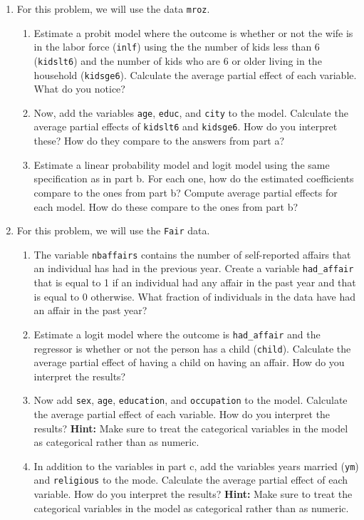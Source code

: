 \documentclass[
  letterpaper,
  DIV=11,
  numbers=noendperiod]{scrreprt}
\begin{document}
\begin{enumerate}
\def\labelenumi{\arabic{enumi}.}
\item
  For this problem, we will use the data \texttt{mroz}.

  \begin{enumerate}
  \def\labelenumii{\alph{enumii})}
  \item
    Estimate a probit model where the outcome is whether or not the wife
    is in the labor force (\texttt{inlf}) using the the number of kids
    less than 6 (\texttt{kidslt6}) and the number of kids who are 6 or
    older living in the household (\texttt{kidsge6}). Calculate the
    average partial effect of each variable. What do you notice?
  \item
    Now, add the variables \texttt{age}, \texttt{educ}, and
    \texttt{city} to the model. Calculate the average partial effects of
    \texttt{kidslt6} and \texttt{kidsge6}. How do you interpret these?
    How do they compare to the answers from part a?
  \item
    Estimate a linear probability model and logit model using the same
    specification as in part b. For each one, how do the estimated
    coefficients compare to the ones from part b? Compute average
    partial effects for each model. How do these compare to the ones
    from part b?
  \end{enumerate}
\item
  For this problem, we will use the \texttt{Fair} data.

  \begin{enumerate}
  \def\labelenumii{\alph{enumii})}
  \item
    The variable \texttt{nbaffairs} contains the number of self-reported
    affairs that an individual has had in the previous year. Create a
    variable \texttt{had\_affair} that is equal to 1 if an individual
    had any affair in the past year and that is equal to 0 otherwise.
    What fraction of individuals in the data have had an affair in the
    past year?
  \item
    Estimate a logit model where the outcome is \texttt{had\_affair} and
    the regressor is whether or not the person has a child
    (\texttt{child}). Calculate the average partial effect of having a
    child on having an affair. How do you interpret the results?
  \item
    Now add \texttt{sex}, \texttt{age}, \texttt{education}, and
    \texttt{occupation} to the model. Calculate the average partial
    effect of each variable. How do you interpret the results?
    \textbf{Hint:} Make sure to treat the categorical variables in the
    model as categorical rather than as numeric.
  \item
    In addition to the variables in part c, add the variables years
    married (\texttt{ym}) and \texttt{religious} to the mode. Calculate
    the average partial effect of each variable. How do you interpret
    the results? \textbf{Hint:} Make sure to treat the categorical
    variables in the model as categorical rather than as numeric.
  \end{enumerate}
\end{enumerate}
\end{document}

